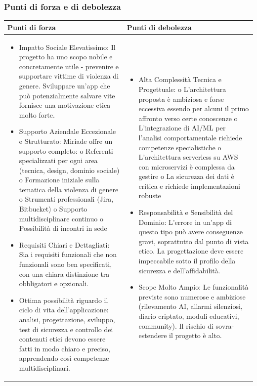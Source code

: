 \documentclass[a4paper,11pt]{article}
\begin{document}
\subsubsection{Punti di forza e di debolezza}
\begin{tabularx}{\textwidth}{|X|X|}
\hline
\rowcolor{lightgray!40} %
\textbf{Punti di forza} & \textbf{Punti di debolezza} \\
\hline
\begin{itemize}
\item Impatto Sociale Elevatissimo: Il progetto ha uno scopo nobile e concretamente utile - prevenire e supportare vittime di violenza di genere. Sviluppare un'app che può potenzialmente salvare vite fornisce una motivazione etica molto forte.

\item Supporto Aziendale Eccezionale e Strutturato: Miriade offre un supporto completo:
o  	Referenti specializzati per ogni area (tecnica, design, dominio sociale)
o  	Formazione iniziale sulla tematica della violenza di genere
o  	Strumenti professionali (Jira, Bitbucket)
o  	Supporto multidisciplinare continuo
o  	Possibilità di incontri in sede
\item Requisiti Chiari e Dettagliati: Sia i requisiti funzionali che non funzionali sono ben specificati, con una chiara distinzione tra obbligatori e opzionali.
\item Ottima possibilità riguardo il ciclo di vita dell’applicazione: analisi, progettazione, sviluppo, test di sicurezza e controllo dei contenuti etici devono essere fatti in modo chiaro e preciso, apprendendo così competenze multidisciplinari.
\end{itemize}
 & \begin{itemize}
\item Alta Complessità Tecnica e Progettuale:
o	L'architettura proposta è ambiziosa e forse eccessiva essendo per alcuni il primo affronto verso certe conoscenze
o	L'integrazione di AI/ML per l'analisi comportamentale richiede competenze specialistiche
o	L'architettura serverless su AWS con microservizi è complessa da gestire
o	La sicurezza dei dati è critica e richiede implementazioni robuste

\item 	Responsabilità e Sensibilità del Dominio: L'errore in un'app di questo tipo può avere conseguenze gravi, soprattutto dal punto di vista etico. La progettazione deve essere impeccabile sotto il profilo della sicurezza e dell'affidabilità.
\item Scope Molto Ampio: Le funzionalità previste sono numerose e ambiziose (rilevamento AI, allarmi silenziosi, diario criptato, moduli educativi, community). Il rischio di sovra-estendere il progetto è alto.
\end{itemize} \\
\hline
\end{tabularx}
\end{document}
